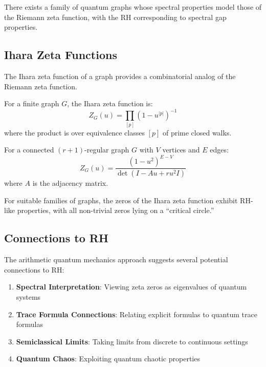 \begin{conjecture}
\label{conj:quantum_graph_rh}
There exists a family of quantum graphs whose spectral properties model those of the Riemann zeta function, with the RH corresponding to spectral gap properties.
\end{conjecture}

\subsection{Ihara Zeta Functions}

The Ihara zeta function of a graph provides a combinatorial analog of the Riemann zeta function.

\begin{definition}
\label{def:ihara_zeta}
For a finite graph $G$, the Ihara zeta function is:
\begin{equation}
Z_G(u) = \prod_{[p]} (1 - u^{|p|})^{-1}
\label{eq:ihara_zeta}
\end{equation}
where the product is over equivalence classes $[p]$ of prime closed walks.
\end{definition}

\begin{theorem}
\label{thm:ihara_theorem}
For a connected $(r+1)$-regular graph $G$ with $V$ vertices and $E$ edges:
\begin{equation}
Z_G(u) = \frac{(1-u^2)^{E-V}}{\det(I - Au + ru^2 I)}
\label{eq:ihara_formula}
\end{equation}
where $A$ is the adjacency matrix.
\end{theorem}

\begin{conjecture}
\label{conj:graph_rh}
For suitable families of graphs, the zeros of the Ihara zeta function exhibit RH-like properties, with all non-trivial zeros lying on a ``critical circle.''
\end{conjecture}

\subsection{Connections to RH}

The arithmetic quantum mechanics approach suggests several potential connections to RH:

\begin{enumerate}
\item \textbf{Spectral Interpretation}: Viewing zeta zeros as eigenvalues of quantum systems
\item \textbf{Trace Formula Connections}: Relating explicit formulas to quantum trace formulas  
\item \textbf{Semiclassical Limits}: Taking limits from discrete to continuous settings
\item \textbf{Quantum Chaos}: Exploiting quantum chaotic properties
\end{enumerate}

